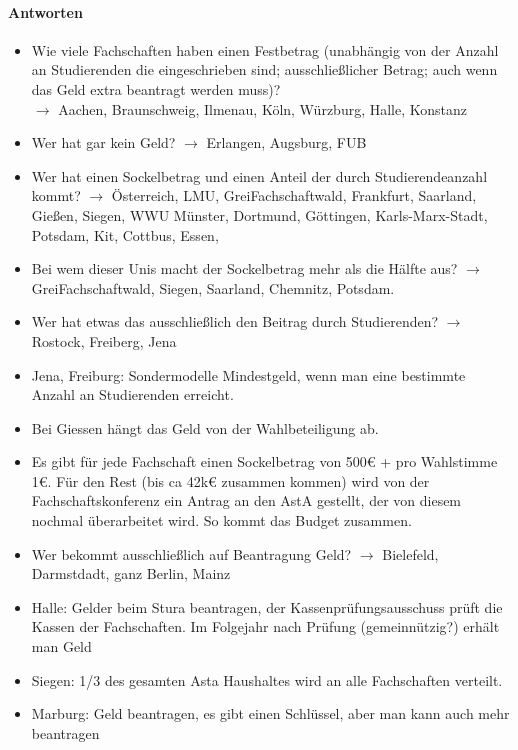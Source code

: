       \paragraph{Antworten}
        \begin{itemize}
          \item Wie viele Fachschaften haben einen Festbetrag (unabhängig von der Anzahl an Studierenden die eingeschrieben sind; ausschließlicher Betrag; auch wenn das Geld extra beantragt werden muss)? \\
          $\rightarrow$ Aachen, Braunschweig, Ilmenau, Köln, Würzburg, Halle, Konstanz
          \item Wer hat gar kein Geld? $\rightarrow$ Erlangen, Augsburg, FUB
          \item Wer hat einen Sockelbetrag und einen Anteil der durch Studierendeanzahl kommt? $\rightarrow$ Österreich, LMU, GreiFachschaftwald, Frankfurt, Saarland, Gießen, Siegen, WWU Münster, Dortmund, Göttingen, Karls-Marx-Stadt, Potsdam, Kit, Cottbus, Essen,
          \item Bei wem dieser Unis macht der Sockelbetrag mehr als die Hälfte aus? $\rightarrow$ GreiFachschaftwald, Siegen, Saarland, Chemnitz, Potsdam.
          \item Wer hat etwas das ausschließlich den Beitrag durch Studierenden? $\rightarrow$ Rostock, Freiberg, Jena
          \item Jena, Freiburg: Sondermodelle Mindestgeld, wenn man eine bestimmte Anzahl an Studierenden erreicht.
          \item Bei Giessen hängt das Geld von der Wahlbeteiligung ab.
          \item Es gibt für jede Fachschaft einen Sockelbetrag von 500€ + pro Wahlstimme 1€. Für den Rest (bis ca 42k€ zusammen kommen) wird von der Fachschaftskonferenz ein Antrag an den AstA gestellt, der von diesem nochmal überarbeitet wird. So kommt das Budget zusammen.
          \item Wer bekommt ausschließlich auf Beantragung Geld? $\rightarrow$ Bielefeld, Darmstdadt, ganz Berlin, Mainz
          \item Halle: Gelder beim Stura beantragen, der Kassenprüfungsausschuss prüft die Kassen der Fachschaften. Im Folgejahr nach Prüfung (gemeinnützig?) erhält man Geld
          \item Siegen: 1/3 des gesamten Asta Haushaltes wird an alle Fachschaften verteilt.
          \item Marburg: Geld beantragen, es gibt einen Schlüssel, aber man kann auch mehr beantragen

\end{itemize}
